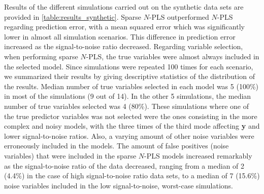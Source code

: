 Results of the different simulations carried out on the synthetic data sets are provided in \autoref{table:results_synthetic}. Sparse $N$-PLS outperformed $N$-PLS regarding prediction error, with a mean squared error which was significantly lower in almost all simulation scenarios. This difference in prediction error increased as the signal-to-noise ratio decreased. Regarding variable selection, when performing sparse $N$-PLS, the true variables were almost always included in the selected model. Since simulations were repeated 100 times for each scenario, we summarized their results by giving descriptive statistics of the distribution of the results. Median number of true variables selected in each model was 5 (100\%) in most of the simulations (9 out of 14). In the other 5 simulations, the median number of true variables selected was 4 (80\%). These simulations where one of the true predictor variables was not selected were the ones consisting in the more complex and noisy models, with the three times of the third mode affecting \textbf{y} and lower signal-to-noise ratios. Also, a varying amount of other noise variables were erroneously included in the models. The amount of false positives (noise variables) that were included in the sparse $N$-PLS models increased remarkably as the signal-to-noise ratio of the data decreased, ranging from a median of 2 (4.4\%) in the case of high signal-to-noise ratio data sets, to a median of 7 (15.6\%) noise variables included in the low signal-to-noise, worst-case simulations. 

